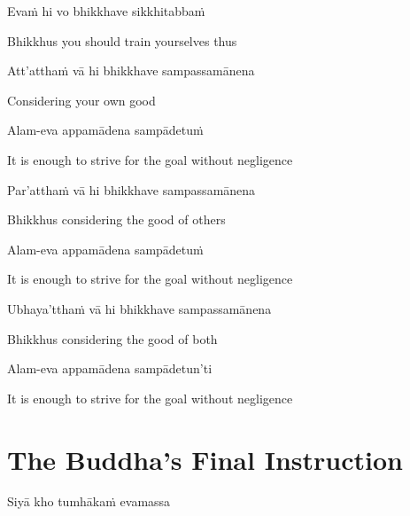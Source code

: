 Evaṁ hi vo bhikkhave sikkhitabbaṁ

\begin{cprenglish}
Bhikkhus you should train yourselves thus
\end{cprenglish}

Att’atthaṁ vā hi bhikkhave sampassamānena

\begin{cprenglish}
Considering your own good
\end{cprenglish}

Alam-eva appamādena sampādetuṁ

\begin{cprenglish}
It is enough to strive for the goal without negligence
\end{cprenglish}

Par’atthaṁ vā hi bhikkhave sampassamānena

\begin{cprenglish}
Bhikkhus considering the good of others
\end{cprenglish}

Alam-eva appamādena sampādetuṁ

\begin{cprenglish}
It is enough to strive for the goal without negligence
\end{cprenglish}

Ubhaya’tthaṁ vā hi bhikkhave sampassamānena

\begin{cprenglish}
Bhikkhus considering the good of both
\end{cprenglish}

Alam-eva appamādena sampādetun'ti

\begin{cprenglish}
It is enough to strive for the goal without negligence
\end{cprenglish}


\clearpage

\section*{The Buddha's Final Instruction}

\begin{leader}
\end{leader}

Siyā kho tumhākaṁ evamassa

